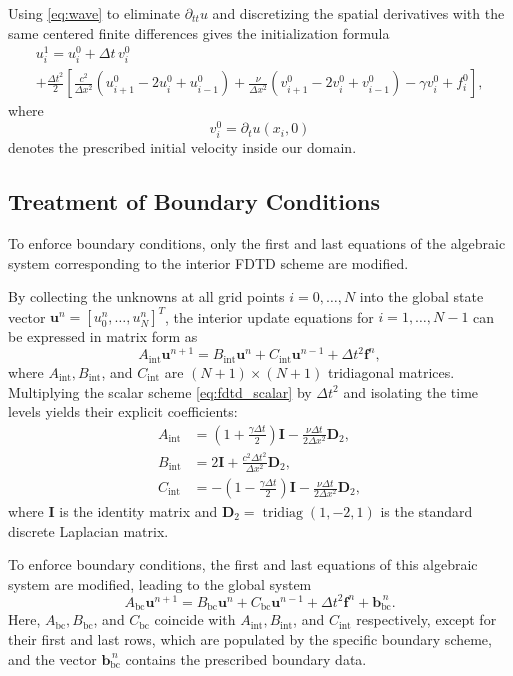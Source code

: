 \documentclass{Configuration_Files/PoliMi3i_thesis}
\begin{document}
Using \eqref{eq:wave} to eliminate \(\partial_{tt}u\) and discretizing the spatial derivatives with the same centered finite differences gives the initialization formula
\begin{multline}
u_i^1
=
u_i^0
+
\Delta t\,v_i^0
\\
+
\frac{\Delta t^2}{2}
\left[
\frac{c^2}{\Delta x^2}
\left(
u_{i+1}^0-2u_i^0+u_{i-1}^0
\right)
+
\frac{\nu}{\Delta x^2}
\left(
v_{i+1}^0-2v_i^0+v_{i-1}^0
\right)
-
\gamma v_i^0
+
f_i^0
\right],
\end{multline}
where
\[
v_i^0=\partial_tu(x_i,0)
\]
denotes the prescribed initial velocity inside our domain.

\subsection{Treatment of Boundary Conditions}

To enforce boundary conditions, only the first and last equations of the algebraic system corresponding to the interior FDTD scheme are modified.

By collecting the unknowns at all grid points $i=0,\dots,N$ into the global state vector $\mathbf{u}^n = [u_0^n, \dots, u_N^n]^T$, the interior update equations for $i=1,\dots,N-1$ can be expressed in matrix form as
\begin{equation}
A_{\mathrm{int}}\mathbf{u}^{n+1}
=
B_{\mathrm{int}}\mathbf{u}^{n}
+
C_{\mathrm{int}}\mathbf{u}^{n-1}
+
\Delta t^2\mathbf{f}^{n},
\label{eq:fdtd_interior_system}
\end{equation}
where $A_{\mathrm{int}}, B_{\mathrm{int}}$, and $C_{\mathrm{int}}$ are $(N+1)\times(N+1)$ tridiagonal matrices. Multiplying the scalar scheme \eqref{eq:fdtd_scalar} by $\Delta t^2$ and isolating the time levels yields their explicit coefficients:
\begin{align*}
A_{\mathrm{int}}
&=
\left(1+\frac{\gamma\Delta t}{2}\right)\mathbf{I}
-
\frac{\nu\Delta t}{2\Delta x^2} \mathbf{D}_2,
\\
B_{\mathrm{int}}
&=
2\mathbf{I}
+
\frac{c^2\Delta t^2}{\Delta x^2} \mathbf{D}_2,
\\
C_{\mathrm{int}}
&=
-\left(1-\frac{\gamma\Delta t}{2}\right)\mathbf{I}
-
\frac{\nu\Delta t}{2\Delta x^2} \mathbf{D}_2,
\end{align*}
where $\mathbf{I}$ is the identity matrix and $\mathbf{D}_2 = \operatorname{tridiag}(1, -2, 1)$ is the standard discrete Laplacian matrix.

To enforce boundary conditions, the first and last equations of this algebraic system are modified, leading to the global system
\begin{equation}
A_{\mathrm{bc}}\mathbf{u}^{n+1}
=
B_{\mathrm{bc}}\mathbf{u}^{n}
+
C_{\mathrm{bc}}\mathbf{u}^{n-1}
+
\Delta t^2\mathbf{f}^{n}
+
\mathbf{b}_{\mathrm{bc}}^{\,n}.
\label{eq:fdtd_global_system}
\end{equation}
Here, $A_{\mathrm{bc}}, B_{\mathrm{bc}}$, and $C_{\mathrm{bc}}$ coincide with $A_{\mathrm{int}}, B_{\mathrm{int}}$, and $C_{\mathrm{int}}$ respectively, except for their first and last rows, which are populated by the specific boundary scheme, and the vector $\mathbf{b}_{\mathrm{bc}}^{\,n}$ contains the prescribed boundary data.
\end{document}
